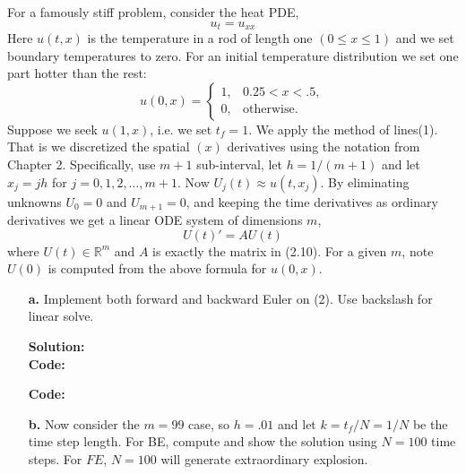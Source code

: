 \documentclass[12pt]{article}
\makeatletter
\theoremstyle{homework}
\newenvironment{exercise}[1]
{\def\@currentlabel{#1}\exercisecore}
{\endexercisecore}
\newcommand{\localhead}[1]{\par\smallskip\noindent\textbf{#1}\nobreak\\}%
\newcommand\solution{\localhead{Solution:}}
\newcommand{\Reals}{\ensuremath{\mathbb R}}
\let\RR\Reals
\makeatother
\begin{document}
\begin{exercise}{Problem P33} For a famously stiff problem, consider the heat PDE, 
  \begin{equation*}
    u_t = u_{xx}
  \end{equation*}
  Here $u(t, x)$ is the temperature in a rod of length one $(0 \leq x \leq 1)$ and we set boundary 
  temperatures to zero. For an initial temperature distribution we set one part hotter than the rest:
  \begin{equation}
    u(0, x) = \begin{cases} 1, & 0.25 < x < .5,\\
      0, &\text{otherwise}.
    \end{cases}
  \end{equation}
  Suppose we seek $u(1, x)$, i.e. we set $t_f = 1$. 
  We apply the method of lines(1). That is we discretized the spatial $(x)$
  derivatives using the notation from Chapter 2. Specifically, use $m + 1$ sub-interval, let $h = 1/(m + 1)$
  and let $x_j = jh$ for $j = 0, 1, 2, \dots, m+1$. Now $U_j(t) \approx u(t, x_j).$ By eliminating unknowns $U_0 = 0$
  and $U_{m + 1} = 0$, and keeping the time derivatives as ordinary derivatives we get a linear ODE system of dimensions $m$,
  \begin{equation}
    U(t)' = AU(t)
  \end{equation}
  where $U(t) \in \RR^m$ and $A$ is exactly the matrix in (2.10). For a given $m$, note $U(0)$ is computed from the above formula 
  for $u(0, x)$. 
  
  
  \begin{enumerate}
    \item[\textbf{a.}] Implement both forward and backward Euler on (2). Use backslash for linear solve. 
    \solution

    \textbf{Code:}
    \begin{center}
      
    \end{center}
    
    \textbf{Code:}
    \begin{center}
      
    \end{center}



    \item[\textbf{b.}] Now consider the $m = 99$ case, so $h = .01$ and let $k = t_f/N = 1/N$ be 
    the time step length. For BE, compute and show the solution using $N = 100$ time steps. For 
    $FE$, $N = 100$ will generate extraordinary explosion. 


\end{enumerate}
\end{exercise}
\end{document}
